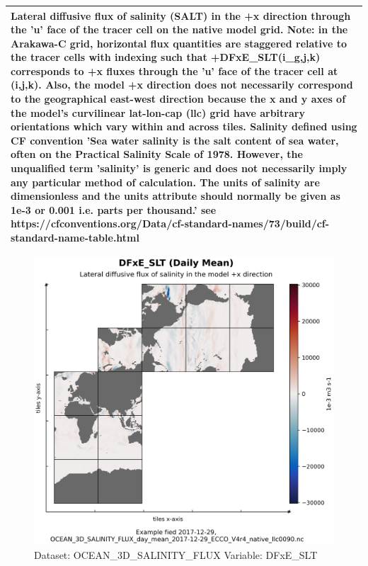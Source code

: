 \begin{longtable}{|p{}|p{}|p{}|p{}|}
\multicolumn{4}{|p{1\textwidth}|}{Lateral diffusive flux of salinity (SALT) in the +x direction through the 'u' face of the tracer cell on the native model grid. Note: in the Arakawa-C grid, horizontal flux quantities are staggered relative to the tracer cells with indexing such that +DFxE\_SLT(i\_g,j,k) corresponds to +x fluxes through the 'u' face of the tracer cell at (i,j,k). Also, the model +x direction does not necessarily correspond to the geographical east-west direction because the x and y axes of the model's curvilinear lat-lon-cap (llc) grid have arbitrary orientations which vary within and across tiles. Salinity defined using CF convention 'Sea water salinity is the salt content of sea water, often on the Practical Salinity Scale of 1978. However, the unqualified term 'salinity' is generic and does not necessarily imply any particular method of calculation. The units of salinity are dimensionless and the units attribute should normally be given as 1e-3 or 0.001 i.e. parts per thousand.' see https://cfconventions.org/Data/cf-standard-names/73/build/cf-standard-name-table.html} \\ \hline
\end{longtable}

\begin{figure}[H]
\centering
\includegraphics[width=\textwidth]{../images/plots/native_plots/Ocean_Three-Dimensional_Salinity_Fluxes/DFxE_SLT.png}
\caption{Dataset: OCEAN\_3D\_SALINITY\_FLUX Variable: DFxE\_SLT}
\label{tab:table-OCEAN_3D_SALINITY_FLUX_DFxE_SLT-Plot}
\end{figure}
\pagebreak
